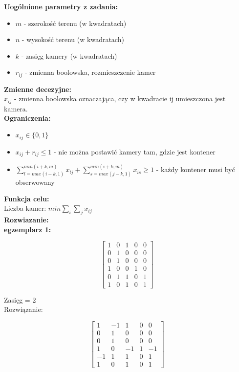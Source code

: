 \documentclass[15pt, a4paper]{article}
\begin{document}
\noindent\textbf{Uogólnione parametry z zadania:}

\begin{itemize}
    \item \( m \) - szerokość terenu (w kwadratach)
    \item \( n \) - wysokość terenu (w kwadratach)
    \item \( k \) - zasięg kamery (w kwadratach)
    \item \( r_{ij} \) - zmienna boolowska, rozmieszczenie kamer
\end{itemize}

\noindent\textbf{Zmienne decezyjne:}\\

\(x_{ij}\) - zmienna boolowska oznaczająca, czy w kwadracie ij umieszczona jest kamera.\\

\noindent\textbf{Ograniczenia:}

\begin{itemize}
    \item \(x_{ij} \in \{0, 1\} \)
    \item \(x_{ij} + r_{ij} \leq 1 \) - nie można postawić kamery tam, gdzie jest kontener
    \item \(\sum_{l = max(i-k, 1)}^{min(i+k,m)}x_{lj} + \sum_{s = max(j-k, 1)}^{min(i+k,m)}x_{is} \geq 1 \)  - każdy kontener musi być obserwowany
\end{itemize}

\noindent\textbf{Funkcja celu:}\\

Liczba kamer: \(min \sum_{i}\sum_{j}x_{ij} \)\\

\noindent\textbf{Rozwiazanie:}\\ 

\textbf{egzemplarz 1:}


\[
\begin{bmatrix}
1 & 0 & 1 & 0 & 0 \\
0 & 1 & 0 & 0 & 0 \\
0 & 1 & 0 & 0 & 0 \\
1 & 0 & 0 & 1 & 0 \\
0 & 1 & 1 & 0 & 1 \\
1 & 0 & 1 & 0 & 1
\end{bmatrix}
\]

Zasięg = 2 \\

Rozwiązanie:

\[
\begin{bmatrix}
1 & -1 & 1 & 0 & 0 \\
0 & 1 & 0 & 0 & 0 \\
0 & 1 & 0 & 0 & 0 \\
1 & 0 & -1 & 1 & -1 \\
-1 & 1 & 1 & 0 & 1 \\
1 & 0 & 1 & 0 & 1
\end{bmatrix}
\]
\end{document}
